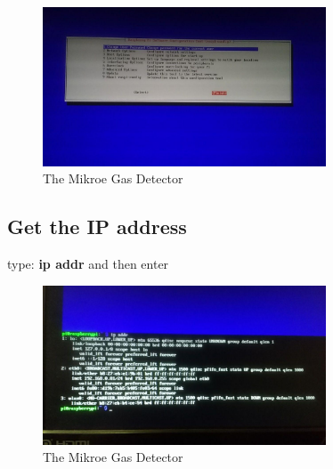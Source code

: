 \documentclass[11pt]{report}
\begin{document}
			\begin{figure}[ht]
				\centering
				\includegraphics[width=0.75\textwidth]{images/pi/ssh_5.jpg} 
				\caption{The Mikroe Gas Detector}
			\end{figure}
		\subsection{Get the IP address}
			type: \textbf{ip addr} and then enter
			\begin{figure}[ht]
				\centering
				\includegraphics[width=0.75\textwidth]{images/pi/get_ip.jpg} 
				\caption{The Mikroe Gas Detector}
			\end{figure}
			\newpage
\end{document}
